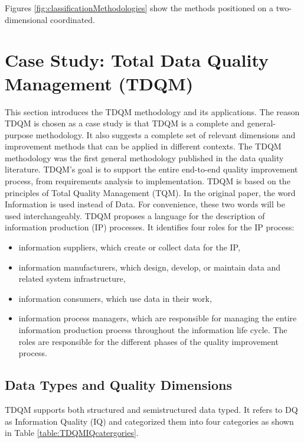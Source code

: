 \documentclass[pdftex,english,oribibl]{llncs}
\begin{document}
Figures \ref{fig:classificationMethodologies} show the methods positioned on a two-dimensional coordinated.

\section{Case Study: Total Data Quality Management (TDQM)}\label{sec:TDQM}
 \cite{Bowo2019CaseStudy}

This section introduces the TDQM methodology and its applications.  The reason TDQM is chosen as a case study is that TDQM is a complete and general-purpose methodology. It also suggests a complete set of relevant dimensions and improvement methods that can be applied in different contexts.
The TDQM methodology was the first general methodology published in the data quality literature. \cite{Wang1998TDQM}
TDQM’s goal is to support the entire end-to-end quality improvement process, from requirements analysis to implementation.
TDQM is based on the principles of Total Quality Management (TQM). \cite{OAKLAND1999TQM}  In the original paper, the word Information is used instead of Data. For convenience, these two words will be used interchangeably. TDQM proposes a language for the description of information production (IP) processes.  It identifies four roles for the IP process:
\begin{itemize}
    \item information suppliers, which create or collect data for the IP,
    \item information manufacturers, which design, develop, or maintain data and related system infrastructure,
    \item information consumers, which use data in their work,
    \item information process managers, which are responsible for managing the entire information production process throughout the information life cycle.
The roles are responsible for the different phases of the quality improvement process.
\end{itemize}
\subsection{Data Types and Quality Dimensions}
TDQM supports both structured and semistructured data typed. It refers to DQ as Information Quality (IQ) and categorized them into four categories as shown in Table \ref{table:TDQMIQcatergories}.
\end{document}
